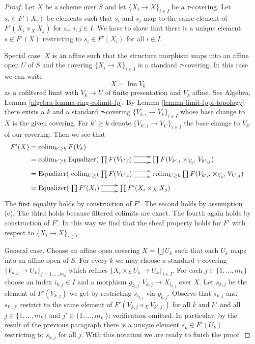 \documentclass[10pt,a4paper]{amsart}
\theoremstyle{plain}
\theoremstyle{definition}
\theoremstyle{remark}
\numberwithin{equation}{subsection}
\def\lim{\mathop{\mathrm{lim}}\nolimits}
\def\colim{\mathop{\mathrm{colim}}\nolimits}
\begin{document}
\begin{proof}
Let $X$ be a scheme over $S$ and let $\{X_i \to X\}_{i \in I}$
be a $\tau$-covering. Let $s_i \in F'(X_i)$ be elements such that
$s_i$ and $s_j$ map to the same element of $F'(X_i \times_X X_j)$
for all $i, j \in I$. We have to show that there is a
unique element $s \in F'(X)$ restricting to $s_i \in F'(X_i)$ for all $i \in I$.

\medskip\noindent
Special case: $X$ is an affine such that the structure morphism
maps into an affine open $U$ of $S$ and the covering
$\{X_i \to X\}_{i \in I}$ is a standard $\tau$-covering.
In this case we can write
$$
X = \lim V_k
$$
as a cofiltered limit with $V_k \to U$ of finite presentation
and $V_k$ affine. See Algebra, Lemma \ref{algebra-lemma-ring-colimit-fp}.
By Lemma \ref{lemma-limit-fppf-topology} there exists a $k$ and a standard
$\tau$-covering $\{V_{k, i} \to V_k\}_{i \in I}$ whose base change
to $X$ is the given covering. For $k' \geq k$ denote
$\{V_{k', i} \to V_{k'}\}_{i \in I}$ the base change to $V_{k'}$
of our covering. Then we see that
\begin{align*}
F'(X)
& =
\colim_{k' \geq k} F(V_k) \\
& =
\colim_{k' \geq k}
\text{Equalizer}(
\xymatrix{
\prod F(V_{k', i})
\ar@<1ex>[r] \ar@<-1ex>[r] &
\prod F(V_{k', i} \times_{V_{k'}} V_{k', j})
}
\\
& =
\text{Equalizer}(
\xymatrix{
\colim_{k' \geq k}
\prod F(V_{k', i})
\ar@<1ex>[r] \ar@<-1ex>[r] &
\colim_{k' \geq k}
\prod F(V_{k', i} \times_{V_{k'}} V_{k', j})
}
\\
& =
\text{Equalizer}(
\xymatrix{
\prod F'(X_i)
\ar@<1ex>[r] \ar@<-1ex>[r] &
\prod F'(X_i \times_X X_j)
}
\end{align*}
The first equality holds by construction of $F'$. The second holds by
assumption (c). The third holds because filtered colimits are exact.
The fourth again holds by construction of $F'$.
In this way we find that the sheaf property holds for $F'$
with respect to $\{X_i \to X\}_{i \in I}$.

\medskip\noindent
General case. Choose an affine open covering $X = \bigcup U_k$ such that
each $U_k$ maps into an affine open of $S$. For every $k$ we may choose
a standard $\tau$-covering $\{V_{k, j} \to U_k\}_{j = 1, \ldots, m_k}$
which refines $\{X_i \times_X U_k \to U_k\}_{i \in I}$. For each
$j \in \{1, \ldots, m_k\}$ choose an index $i_{k, j} \in I$
and a morphism $g_{k, j} : V_{k, j} \to X_{i_{k, j}}$ over $X$.
Let $s_{k, j}$ be the element of $F'(V_{k, j})$ we get by restricting
$s_{i_{k, j}}$ via $g_{k, j}$. Observe that $s_{k, j}$ and $s_{k', j'}$
restrict to the same element of $F'(V_{k, j} \times_X V_{k', j'})$
for all $k$ and $k'$ and all $j \in \{1, \ldots, m_k\}$
and $j' \in \{1, \ldots, m_{k'}\}$; verification omitted.
In particular, by the result of the previous paragraph there is a unique
element $s_k \in F'(U_k)$ restricting to $s_{k, j}$ for all $j$.
With this notation we are ready to finish the proof.


\end{proof}
\end{document}
